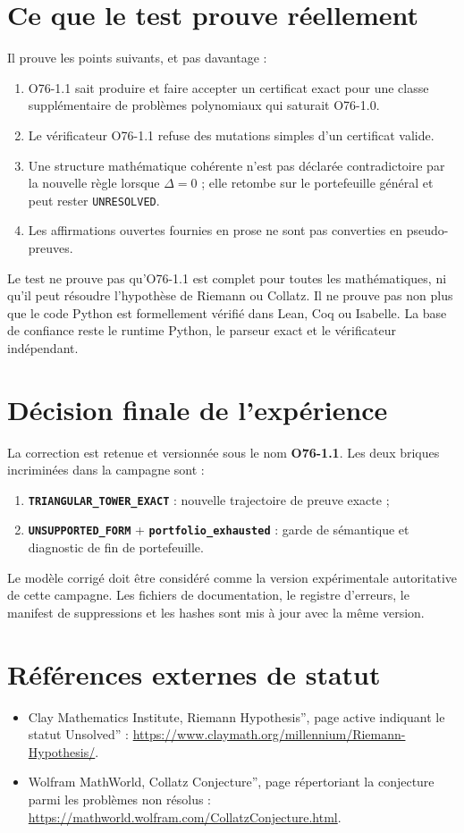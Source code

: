 \documentclass[11pt,a4paper]{article}
\newcommand{\Unresolved}{\texttt{UNRESOLVED}}
\begin{document}
\section{Ce que le test prouve réellement}
Il prouve les points suivants, et pas davantage :
\begin{enumerate}
\item O76-1.1 sait produire et faire accepter un certificat exact pour une classe supplémentaire de problèmes polynomiaux qui saturait O76-1.0.
\item Le vérificateur O76-1.1 refuse des mutations simples d'un certificat valide.
\item Une structure mathématique cohérente n'est pas déclarée contradictoire par la nouvelle règle lorsque $\Delta=0$ ; elle retombe sur le portefeuille général et peut rester \Unresolved{}.
\item Les affirmations ouvertes fournies en prose ne sont pas converties en pseudo-preuves.
\end{enumerate}

Le test ne prouve pas qu'O76-1.1 est complet pour toutes les mathématiques, ni qu'il peut résoudre l'hypothèse de Riemann ou Collatz. Il ne prouve pas non plus que le code Python est formellement vérifié dans Lean, Coq ou Isabelle. La base de confiance reste le runtime Python, le parseur exact et le vérificateur indépendant.

\section{Décision finale de l'expérience}
La correction est retenue et versionnée sous le nom \textbf{O76-1.1}. Les deux briques incriminées dans la campagne sont :
\begin{enumerate}
\item \textbf{\texttt{TRIANGULAR\_TOWER\_EXACT}} : nouvelle trajectoire de preuve exacte ;
\item \textbf{\texttt{UNSUPPORTED\_FORM}} + \textbf{\texttt{portfolio\_exhausted}} : garde de sémantique et diagnostic de fin de portefeuille.
\end{enumerate}

Le modèle corrigé doit être considéré comme la version expérimentale autoritative de cette campagne. Les fichiers de documentation, le registre d'erreurs, le manifest de suppressions et les hashes sont mis à jour avec la même version.

\section*{Références externes de statut}
\begin{itemize}
\item Clay Mathematics Institute, Riemann Hypothesis'', page active indiquant le statut Unsolved'' : \url{https://www.claymath.org/millennium/Riemann-Hypothesis/}.
\item Wolfram MathWorld, Collatz Conjecture'', page répertoriant la conjecture parmi les problèmes non résolus : \url{https://mathworld.wolfram.com/CollatzConjecture.html}.
\end{itemize}
\end{document}
